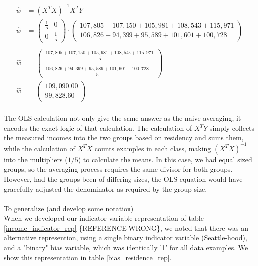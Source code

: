 \begin{align} 
\hat{w} &= (X^T X)^{-1} X^T Y 
\\
\hat{w} &= 
\left(\begin{array}{cc}
          \frac{1}{5} & 0 \\
          0           & \frac{1}{5} 
\end{array}\right)
\cdot
\left(\begin{array}{c}
         107,805 + 107,150 + 105,981 + 108,543 + 115,971 \\
         106,826 +  94,399 +  95,589 + 101,601 + 100,728 
\end{array}\right)
\\
\\
\hat{w} &= 
\left(\begin{array}{c}
         \displaystyle\frac{107,805 + 107,150 + 105,981 + 108,543 + 115,971}{5} \\
         \\
         \displaystyle\frac{106,826 +  94,399 +  95,589 + 101,601 + 100,728}{5} 
\end{array}\right)
\\
\hat{w} &= 
\left(\begin{array}{c}
          109,090.00 \\
          99,828.60
\end{array}\right)
\end{align}
\\
The OLS calculation not only give the same answer as the naive averaging, it
encodes the exact logic of that calculation.  The calculation of $X^T Y$ simply
collects the measured incomes into the two groups based on residency and sums
them, while the calculation of $X^T X$ counts examples in each class, making
$(X^T X)^{-1}$ into the multipliers ($1/5$) to calculate the means. In this
case, we had equal sized groups, so the averaging process requires the same
divisor for both groups.  However, had the groups been of differing sizes, the
OLS equation would have gracefully adjusted the denominator as required by the
group size.\\
\\
To generalize (and develop some notation)
\\
When we developed our indicator-variable representation of table
\ref{income_indicator_rep} \{REFERENCE WRONG\}, we noted that there was an
alternative represention, using a single binary indicator variable
(Seattle-hood), and a "binary" bias variable, which was identically '1' for all
data examples.  We show this representation in table \ref{bias_residence_rep}. 

